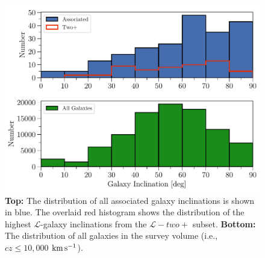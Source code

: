 \documentclass[twocolumn,tighten]{aastex62}
\newcommand{\kms}{$\rm km\, s^{-1}$}
\begin{document}
\begin{figure}
\centering
  \includegraphics[width=0.9\linewidth]{hist(adjustedInc)_associated_group_all_overlaid_double.pdf}
  \caption{\small{\textbf{Top:} The distribution of all associated galaxy inclinations is shown in blue. The overlaid red histogram shows the distribution of the highest $\mathcal{L}$-galaxy inclinations from the $\mathcal{L}-two+$ subset. \textbf{Bottom:} The distribution of all galaxies in the survey volume (i.e., $cz \leq 10,000$ \kms).}}
\label{inc_hist}
\vspace{0pt}
\end{figure}
\end{document}
